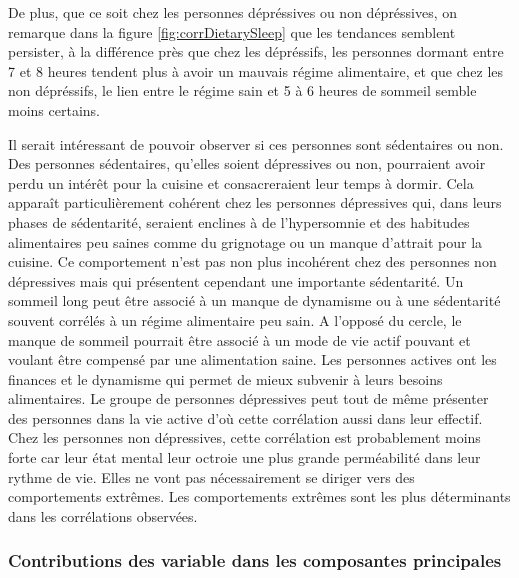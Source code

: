 De plus, que ce soit chez les personnes dépréssives ou non dépréssives, on remarque dans la figure \ref{fig:corrDietarySleep} que les tendances semblent persister, à la différence près que chez les dépréssifs, les personnes dormant entre 7 et 8 heures tendent plus à avoir un mauvais régime alimentaire, et que chez les non dépréssifs, le lien entre le régime sain et 5 à 6 heures de sommeil semble moins certains. 

Il serait intéressant de pouvoir observer si ces personnes sont sédentaires ou non. 
Des personnes sédentaires, qu’elles soient dépressives ou non, pourraient avoir perdu un intérêt pour la cuisine et consacreraient leur temps à dormir. Cela apparaît particulièrement cohérent chez les personnes dépressives qui, dans leurs phases de sédentarité, seraient enclines à de l’hypersomnie et des habitudes alimentaires peu saines comme du grignotage ou un manque d’attrait pour la cuisine. Ce comportement n’est pas non plus incohérent chez des personnes non dépressives mais qui présentent cependant une importante sédentarité. Un sommeil long peut être associé à un manque de dynamisme ou à une sédentarité souvent corrélés à un régime alimentaire peu sain.
A l’opposé du cercle, le manque de sommeil pourrait être associé à un mode de vie actif pouvant et voulant être compensé par une alimentation saine. Les personnes actives ont les finances et le dynamisme qui permet de mieux subvenir à leurs besoins alimentaires. Le groupe de personnes dépressives peut tout de même présenter des personnes dans la vie active d’où cette corrélation aussi dans leur effectif. Chez les personnes non dépressives, cette corrélation est probablement moins forte car leur état mental leur octroie une plus grande perméabilité dans leur rythme de vie. Elles ne vont pas nécessairement se diriger vers des comportements extrêmes.
Les comportements extrêmes sont les plus déterminants dans les corrélations observées.

\subsubsection{Contributions des variable dans les composantes principales}

